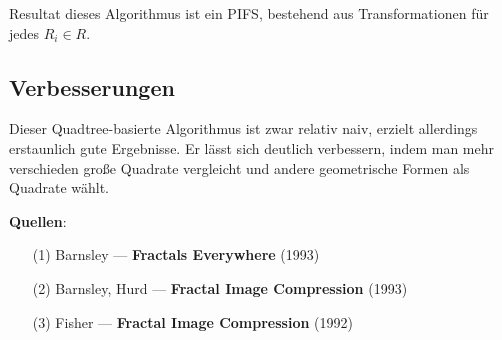 \documentclass[afourpaper]{latex-classes/handout}
\begin{document}
Resultat dieses Algorithmus ist ein PIFS, bestehend aus Transformationen für jedes \( R_i \in R \).

\subsection{Verbesserungen}

Dieser Quadtree-basierte Algorithmus ist zwar relativ naiv, erzielt allerdings erstaunlich gute Ergebnisse. Er lässt sich deutlich verbessern, indem man mehr verschieden große Quadrate vergleicht und andere geometrische Formen als Quadrate wählt.

\begin{marginfigure}
  \textbf{Quellen}:
  \begin{itemize}
    \item[(1)] Barnsley --- \textbf{Fractals Everywhere} (1993)
    \item[(2)] Barnsley, Hurd --- \textbf{Fractal Image Compression} (1993)
    \item[(3)] Fisher --- \textbf{Fractal Image Compression} (1992)
  \end{itemize}
\end{marginfigure}
\end{document}
